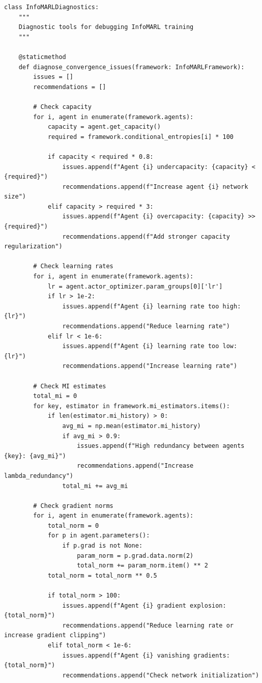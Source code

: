 \documentclass[10pt, letterpaper]{article}
\begin{document}
\begin{lstlisting}
class InfoMARLDiagnostics:
    """
    Diagnostic tools for debugging InfoMARL training
    """

    @staticmethod
    def diagnose_convergence_issues(framework: InfoMARLFramework):
        issues = []
        recommendations = []

        # Check capacity
        for i, agent in enumerate(framework.agents):
            capacity = agent.get_capacity()
            required = framework.conditional_entropies[i] * 100

            if capacity < required * 0.8:
                issues.append(f"Agent {i} undercapacity: {capacity} < {required}")
                recommendations.append(f"Increase agent {i} network size")
            elif capacity > required * 3:
                issues.append(f"Agent {i} overcapacity: {capacity} >> {required}")
                recommendations.append(f"Add stronger capacity regularization")

        # Check learning rates
        for i, agent in enumerate(framework.agents):
            lr = agent.actor_optimizer.param_groups[0]['lr']
            if lr > 1e-2:
                issues.append(f"Agent {i} learning rate too high: {lr}")
                recommendations.append("Reduce learning rate")
            elif lr < 1e-6:
                issues.append(f"Agent {i} learning rate too low: {lr}")
                recommendations.append("Increase learning rate")

        # Check MI estimates
        total_mi = 0
        for key, estimator in framework.mi_estimators.items():
            if len(estimator.mi_history) > 0:
                avg_mi = np.mean(estimator.mi_history)
                if avg_mi > 0.9:
                    issues.append(f"High redundancy between agents {key}: {avg_mi}")
                    recommendations.append("Increase lambda_redundancy")
                total_mi += avg_mi

        # Check gradient norms
        for i, agent in enumerate(framework.agents):
            total_norm = 0
            for p in agent.parameters():
                if p.grad is not None:
                    param_norm = p.grad.data.norm(2)
                    total_norm += param_norm.item() ** 2
            total_norm = total_norm ** 0.5

            if total_norm > 100:
                issues.append(f"Agent {i} gradient explosion: {total_norm}")
                recommendations.append("Reduce learning rate or increase gradient clipping")
            elif total_norm < 1e-6:
                issues.append(f"Agent {i} vanishing gradients: {total_norm}")
                recommendations.append("Check network initialization")


\end{lstlisting}
\end{document}
